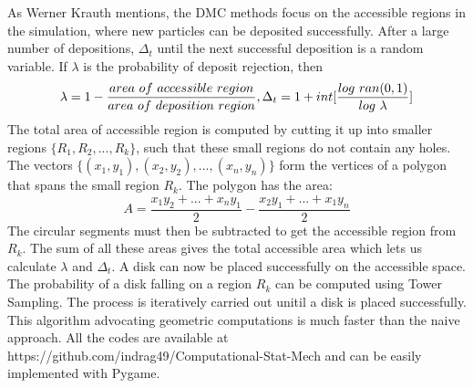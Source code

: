 \documentclass[a0paper,portrait]{baposter}
\begin{document}
\begin{poster}
{%
As Werner Krauth \cite{krauth2006statistical} mentions, the DMC methods focus on the accessible regions in the simulation, where new particles can be deposited successfully. After a large number of depositions, $\Delta_t$ until the next successful deposition is a random variable. If $\lambda$ is the probability of deposit rejection, then \begin{equation}
\lambda = 1 - \frac{area\ of\ accessible\ region}{area\ of\ deposition\ region},\ \\
\Delta_t = 1 + int[\frac{log\ ran(0,1)}{log\ \lambda}]
\end{equation} 
The total area of accessible region is computed by cutting it up into smaller regions $\{R_1, R_2, ..., R_k\}$, such that these small regions do not contain any holes. The vectors $\{(x_1, y_1), (x_2, y_2), ..., (x_n, y_n)\}$ form the vertices of a polygon that spans the small region $R_k$. The polygon has the area:\begin{equation}
A = \frac{x_1y_2 + ... + x_ny_1}{2} - \frac{x_2y_1 + ... + x_1y_n}{2}
\end{equation}
The circular segments must then be subtracted to get the accessible region from $R_k$. The sum of all these areas gives the total accessible area which lets us calculate $\lambda$ and $\Delta_t$. A disk can now be placed successfully on the accessible space. The probability of a disk falling on a region $R_k$ can be computed using Tower Sampling. The process is iteratively carried out unitil a disk is placed successfully. This algorithm advocating geometric computations is much faster than the naive approach. All the codes are available at {\color{red} https://github.com/indrag49/Computational-Stat-Mech} and can be easily implemented with Pygame.


}



\end{poster}
\end{document}

